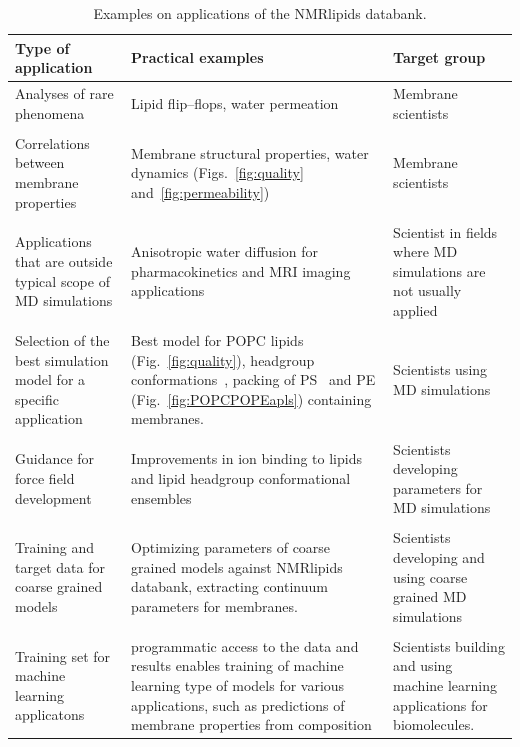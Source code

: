 \documentclass[fleqn,10pt]{wlscirep}
\begin{document}
\begin{table}[t]
    \centering
    \begin{tabular}{p{5.0cm}  p{5.0cm}  p{4.0cm}}
    Type of application     & Practical examples & Target group \\
    \hline
    Analyses of rare phenomena               & Lipid flip--flops, water permeation & Membrane scientists \\
    \\
    Correlations between membrane properties & 
    Membrane structural properties, water dynamics (Figs.~\ref{fig:quality} and~\ref{fig:permeability}) & 
    Membrane scientists \\
    \\
    Applications that are outside typical scope of MD simulations & 
    Anisotropic water diffusion for pharmacokinetics and MRI imaging applications & 
    Scientist in fields where MD simulations are not usually applied \\
    \\
    Selection of the best simulation model for a specific application & 
    Best model for POPC lipids (Fig.~\ref{fig:quality}), headgroup conformations~\cite{bacle21}, 
    packing of PS~\cite{antila22b} and PE (Fig.~\ref{fig:POPCPOPEapls}) containing membranes. &
    Scientists using MD simulations \\
    \\
    Guidance for force field development & 
    Improvements in ion binding to lipids~\cite{melcr18,melcr20} and lipid headgroup conformational ensembles~\cite{yu21,dickson22,grote20} &
    Scientists developing parameters for MD simulations \\
    \\
    Training and target data for coarse grained models & 
    Optimizing parameters of coarse grained models against NMRlipids databank, extracting continuum parameters for membranes. &
    Scientists developing and using coarse grained MD simulations \\
    \\
    Training set for machine learning applicatons &
    programmatic access to the data and results enables training of machine learning type of models for various applications, such as predictions of membrane properties from composition & Scientists building and using machine learning applications for biomolecules.  
    \end{tabular}
    \caption{Examples on applications of the NMRlipids databank.}
    \label{tab:applications}
\end{table}
\end{document}

